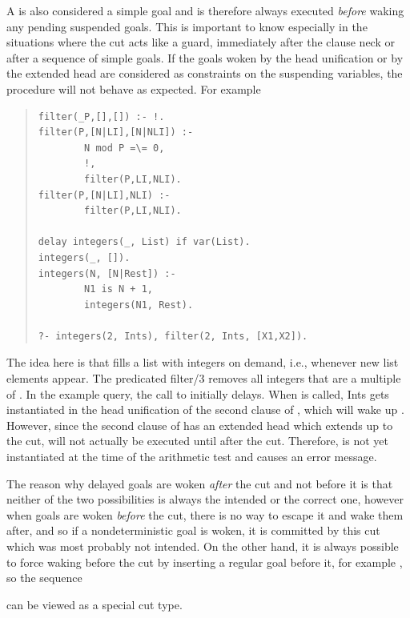 {A
is also considered a simple goal and is therefore
always executed \emph{before} waking any pending suspended goals.
This is important to know especially in the situations where the cut
acts like a guard, immediately after the clause neck or after
a sequence of simple goals.
If the goals woken by the head unification or by the extended head
are considered as constraints on the suspending variables,
the procedure will not behave as expected.
For example
\begin{quote}
\begin{verbatim}
filter(_P,[],[]) :- !.
filter(P,[N|LI],[N|NLI]) :-
        N mod P =\= 0,
        !,
        filter(P,LI,NLI).
filter(P,[N|LI],NLI) :-
        filter(P,LI,NLI).

delay integers(_, List) if var(List).
integers(_, []).
integers(N, [N|Rest]) :-
        N1 is N + 1,
        integers(N1, Rest).

?- integers(2, Ints), filter(2, Ints, [X1,X2]).
\end{verbatim}
\end{quote}
The idea here is that  fills a list with integers on
demand,
i.e., whenever new list elements appear.
The predicated {filter/3} removes all integers that are a multiple
of . In the example query, the call to  initially
delays.
When  is called, Ints gets instantiated in the head
unification
of the second clause of , which will wake up
. However,
since the second clause of  has an extended head which
extends up to
the cut,  will not actually be executed until after the
cut.
Therefore,  is not yet instantiated at the time of the arithmetic test
and causes an error message.

The reason why delayed goals are woken \emph{after} the cut and not before
it is that neither of the two possibilities is always the intended
or the correct one, however when goals are woken \emph{before} the cut,
there is no way to escape it and wake them after, and so if
a nondeterministic goal is woken, it is committed by this cut
which was most probably not intended.
On the other hand, it is always possible to force waking before the cut
by inserting a regular goal before it, for example
,
so the sequence
\begin{quote}
\end{quote}
can be viewed as a special cut type.

}
